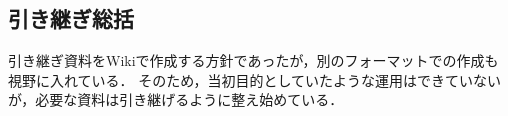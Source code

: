 \subsection*{引き継ぎ総括}


引き継ぎ資料をWikiで作成する方針であったが，別のフォーマットでの作成も視野に入れている．
そのため，当初目的としていたような運用はできていないが，必要な資料は引き継げるように整え始めている．
